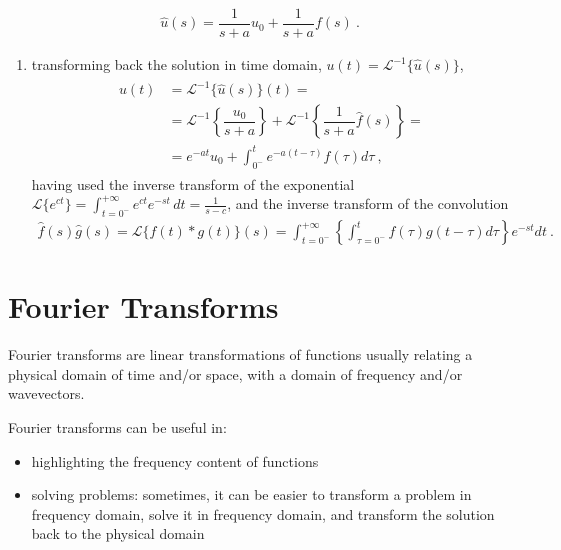 \documentclass[letterpaper,10pt,english]{jupyterBook}
\begin{document}
\begin{equation*}
\begin{split}\hat{u}(s) = \dfrac{1}{s + a} u_0 + \dfrac{1}{s + a} f(s) \ .\end{split}
\end{equation*}\begin{enumerate}
%
\setcounter{enumi}{2}
\item {} 
\sphinxAtStartPar
transforming back the solution in time domain, \(u(t) = \mathscr{L}^{-1}\{ \hat{u}(s) \}\),
\begin{equation*}
\begin{split}\begin{aligned}
     u(t) & = \mathscr{L}^{-1}\{ \hat{u}(s) \} (t) = \\
          & = \mathscr{L}^{-1} \left\{ \dfrac{u_0}{s + a} \right\} +  \mathscr{L}^{-1} \left\{ \dfrac{1}{s + a} \hat{f}(s) \right\} = \\
          & = e^{-at} u_0 + \int_{0^-}^{t} e^{-a(t-\tau)} f(\tau) d \tau \ ,
   \end{aligned}\end{split}
\end{equation*}
\sphinxAtStartPar
having used the inverse transform of the exponential \(\mathscr{L}\{e^{ct}\} = \int_{t=0^-}^{+\infty} e^{ct} e^{-st} \, dt = \frac{1}{s-c}\), and the inverse transform of the convolution
\begin{equation*}
\begin{split}\hat{f}(s) \hat{g}(s) = \mathscr{L}\{ f(t) \ast g(t) \}(s) = \int_{t=0^-}^{+\infty} \left\{ \int_{\tau=0^-}^{t} f(\tau) g(t-\tau) d \tau \right\} e^{-st} dt \ .\end{split}
\end{equation*}
\end{enumerate}

\sphinxstepscope


\chapter{Fourier Transforms}
\label{\detokenize{ch/complex/fourier:fourier-transforms}}\label{\detokenize{ch/complex/fourier:complex-fourier}}\label{\detokenize{ch/complex/fourier::doc}}
\sphinxAtStartPar
Fourier transforms are linear transformations of functions usually relating a physical domain of time and/or space, with a domain of frequency and/or wave\sphinxhyphen{}vectors.

\sphinxAtStartPar
Fourier transforms can be useful in:
\begin{itemize}
\item {} 
\sphinxAtStartPar
highlighting the frequency content of functions

\item {} 
\sphinxAtStartPar
solving problems: sometimes, it can be easier to transform a problem in frequency domain, solve it in frequency domain, and transform the solution back to the physical domain

\end{itemize}
\end{document}
